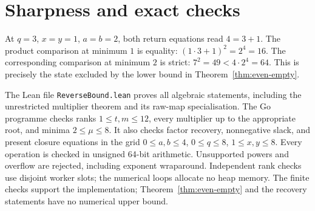 \documentclass[11pt,letterpaper]{article}
\begin{document}
\section{Sharpness and exact checks}

At \(q=3\), \(x=y=1\), \(a=b=2\), both return equations read
\(4=3+1\). The product comparison at minimum \(1\) is equality:
\((1\cdot3+1)^2=2^4=16\). The corresponding comparison at minimum \(2\)
is strict: \(7^2=49<4\cdot2^4=64\). This is precisely the state excluded
by the lower bound in Theorem~\ref{thm:even-empty}.

The Lean file \texttt{ReverseBound.lean} proves all algebraic statements,
including the unrestricted multiplier theorem and its raw-map specialisation.
The Go programme checks ranks \(1\le t,m\le12\), every multiplier up to
 the appropriate root, and minima \(2\le\mu\le8\). It also checks factor
recovery, nonnegative slack, and present closure equations in the grid
\(0\le a,b\le4\), \(0\le q\le8\), \(1\le x,y\le8\).
Every operation is checked in unsigned 64-bit arithmetic. Unsupported powers
and overflow are rejected, including exponent wraparound. Independent rank
checks use disjoint worker slots; the numerical loops allocate no heap memory.
The finite checks support the implementation; Theorem~\ref{thm:even-empty}
and the recovery statements have no numerical upper bound.
\end{document}
